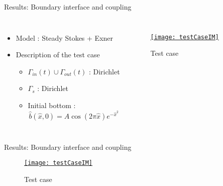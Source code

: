 

\begin{frame}{Results: Boundary interface and coupling}



\begin{columns}
\begin{itemize}
\item Model : Steady Stokes + Exner 
\item Description of the test case

\begin{itemize}
\item $\Gamma_{in}(t)\cup \Gamma_{out}(t)$ : Dirichlet
\item $ \Gamma_s$ : Dirichlet 
\item Initial bottom : $$ \hat{b}(\hat{x},0)=A\cos(2\pi \hat{x})e^{-\hat{x}^2}$$
\end{itemize}
\end{itemize}
\begin{figure}
\href{run:test.avi}{\texttt{[image: testCaseIM]}} 
\caption{Test case }
\end{figure}
\end{columns}


\end{frame}


\begin{frame}{Results: Boundary interface and coupling}


\begin{figure}
\href{run:test2.avi}{\texttt{[image: testCaseIM]}} 
\caption{Test case }
\end{figure}
\end{frame}

